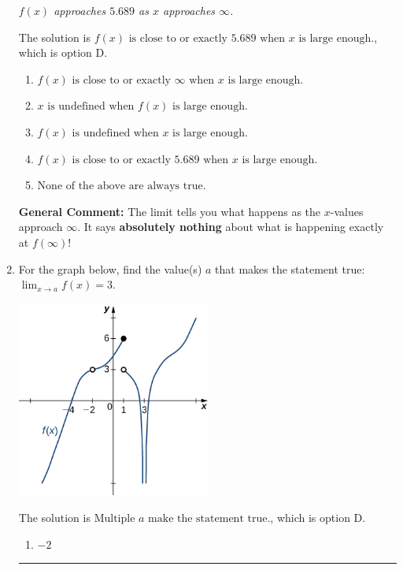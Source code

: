 \documentclass{extbook}[14pt]
\newcommand{\litem}[1]{\item #1

\rule{\textwidth}{0.4pt}}
\begin{document}
\begin{enumerate}
{\begin{center}
    \textit{ $f(x)$ approaches $5.689$ as $x$ approaches $\infty$. }
\end{center}
The solution is \( f(x) \text{ is close to or exactly } 5.689 \text{ when } x \text{ is large enough}. \), which is option D.\begin{enumerate}[label=\Alph*.]
\item \( f(x) \text{ is close to or exactly } \infty \text{ when } x \text{ is large enough}. \)


\item \( x \text{ is undefined when } f(x) \text{ is large enough}. \)


\item \( f(x) \text{ is undefined when } x \text{ is large enough}. \)


\item \( f(x) \text{ is close to or exactly } 5.689 \text{ when } x \text{ is large enough}. \)


\item \( \text{None of the above are always true.} \)


\end{enumerate}

\textbf{General Comment:} The limit tells you what happens as the $x$-values approach $\infty$. It says \textbf{absolutely nothing} about what is happening exactly at $f(\infty)$!
}
\litem{
For the graph below, find the value(s) $a$ that makes the statement true: $ \displaystyle \lim_{x \rightarrow a} f(x) = 3$.

\begin{center}
    \includegraphics[width=0.5\textwidth]{../Figures/evaluateLimitGraphicallyB.png}
\end{center}


The solution is \( \text{Multiple } a \text{ make the statement true}. \), which is option D.\begin{enumerate}[label=\Alph*.]
\item \( -2 \)



\end{enumerate}}
\end{enumerate}
\end{document}
